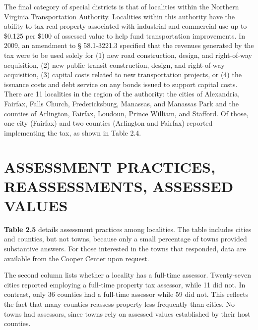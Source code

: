 \documentclass[
]{book}
\begin{document}
The final category of special districts is that of localities within the Northern Virginia Transportation Authority. Localities within this authority have the ability to tax real property associated with industrial and commercial use up to \$0.125 per \$100 of assessed value to help fund transportation improvements. In 2009, an amendment to § 58.1-3221.3 specified that the revenues generated by the tax were to be used solely for (1) new road construction, design, and right-of-way acquisition, (2) new public transit construction, design, and right-of-way acquisition, (3) capital costs related to new transportation projects, or (4) the issuance costs and debt service on any bonds issued to support capital costs. There are 11 localities in the region of the authority: the cities of Alexandria, Fairfax, Falls Church, Fredericksburg, Manassas, and Manassas Park and the counties of Arlington, Fairfax, Loudoun, Prince William, and Stafford. Of those, one city (Fairfax) and two counties (Arlington and Fairfax) reported implementing the tax, as shown in Table 2.4.

\hypertarget{assessment-practices-reassessments-assessed-values}{%
\section{ASSESSMENT PRACTICES, REASSESSMENTS, ASSESSED VALUES}\label{assessment-practices-reassessments-assessed-values}}

\textbf{Table 2.5} details assessment practices among localities. The table includes cities and counties, but not towns, because only a small percentage of towns provided substantive answers. For those interested in the towns that responded, data are available from the Cooper Center upon request.

The second column lists whether a locality has a full-time assessor. Twenty-seven cities reported employing a full-time property tax assessor, while 11 did not. In contrast, only 36 counties had a full-time assessor while 59 did not. This reflects the fact that many counties reassess property less frequently than cities. No towns had assessors, since towns rely on assessed values established by their host counties.
\end{document}
